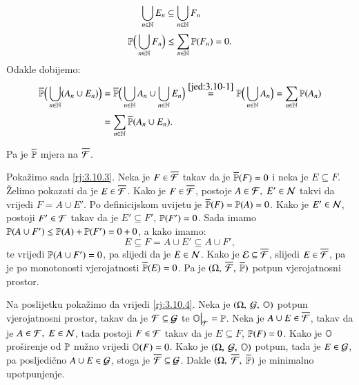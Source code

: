 \begin{rj}[\ref{zad:3.10}]
\begin{enumerate}[label=(\roman*)]
        \begin{equation}    \label{jed:3.10-1}
            \begin{aligned}
                \bigcup\limits_{n \in \mathbb{N}}^{} E_n &\subseteq \bigcup\limits_{n \in \mathbb{N}}^{} F_n\\
                \mathbb{P} \Big( \bigcup\limits_{n \in \mathbb{N}}^{} F_n \Big) &\leq \sum\limits_{n \in \mathbb{N}}^{} \mathbb{P}({F_n}) = 0.
            \end{aligned}
        \end{equation}
        Odakle dobijemo:
        \begin{equation*}
            \begin{aligned}
                \overline{\mathbb{P}} \Big(\bigcup\limits_{n \in \mathbb{N}}^{} (A_n \cup E_n)\Big) &= \overline{\mathbb{P}} \Big(\bigcup\limits_{n \in \mathbb{N}}^{} A_n \cup \bigcup\limits_{n \in \mathbb{N}}^{} E_n \Big) \overset{\eqref{jed:3.10-1}}{=} \mathbb{P} \Big( \bigcup\limits_{n \in \mathbb{N}}^{} A_n \Big) = \sum\limits_{n \in \mathbb{N}}^{} \mathbb{P}({A_n})\\ &= \sum\limits_{n \in \mathbb{N}}^{} \overline{\mathbb{P}} (A_n \cup E_n).
            \end{aligned}
        \end{equation*}
    \end{enumerate}
    Pa je $\overline{\mathbb{P}}$ mjera na $\overline{\mathcal{F}}$.

    Poka\v zimo sada \ref{rj:3.10.3}.
    Neka je $F \in \overline{\mathcal{F}}$ takav da je $\overline{\mathbb{P}} (F) = 0$ i neka je $E \subseteq F$.
    \v Zelimo pokazati da je $E \in \overline{\mathcal{F}}$.
    Kako je $F \in \overline{\mathcal{F}}$, postoje $A \in \mathcal{F}, \; E' \in \mathcal{N}$ takvi da vrijedi $F = A \cup E'$.
    Po definicijskom uvijetu je $\overline{\mathbb{P}} (F) = \mathbb{P}({A}) = 0$.
    Kako je $E' \in \mathcal{N}$, postoji $F' \in \mathcal{F}$ takav da je $E' \subseteq F'$, $\mathbb{P}({F'}) = 0$.
    Sada imamo $\mathbb{P}({A \cup F'}) \leq \mathbb{P}({A}) + \mathbb{P}({F'}) = 0 + 0$, a kako imamo:
    \begin{equation*}
        E \subseteq F = A \cup E' \subseteq A \cup F',
    \end{equation*}
    te vrijedi $\mathbb{P}({A \cup F'}) = 0$, pa slijedi da je $E \in \mathcal{N}$.
    Kako je $\mathcal{E} \subseteq \overline{\mathcal{F}}$, slijedi $E \in \overline{\mathcal{F}}$, pa je po monotonosti vjerojatnosti $\overline{\mathbb{P}} (E) = 0$.
    Pa je $(\Omega, \: \overline{\mathcal{F}}, \: \overline{\mathbb{P}})$ potpun vjerojatnosni prostor.

    Na poslijetku poka\v zimo da vrijedi \ref{rj:3.10.4}.
    Neka je $(\Omega, \: \mathcal{G}, \: \mathbb{O})$ potpun vjerojatnosni prostor, takav da je $\mathcal{F} \subseteq \mathcal{G}$ te $\restr{\masO}{\famF} = \masP$.
    Neka je $A \cup E \in \overline{\mathcal{F}}$, takav da je $A \in \mathcal{F}, \; E \in \mathcal{N}$, tada postoji $F \in \mathcal{F}$ takav da je $E \subseteq F$, $\mathbb{P}({F}) = 0$.
    Kako je $\mathbb{O}$ pro\v sirenje od $\mathbb{P}$ nu\v zno vrijedi $\mathbb{O} (F) = 0$.
    Kako je $(\Omega, \: \mathcal{G}, \: \mathbb{O})$ potpun, tada je $E \in \mathcal{G}$, pa posljedi\v cno $A \cup E \in \mathcal{G}$, stoga je $\overline{\mathcal{F}} \subseteq \mathcal{G}$.
    Dakle $(\Omega, \; \overline{\mathcal{F}}, \; \overline{\mathbb{P}})$ je minimalno upotpunjenje.
    

\end{rj}
